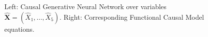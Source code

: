 \documentclass[a4paper, 11pt]{article}
\begin{document}
\begin{figure}[!h]
    \caption{Left: Causal Generative Neural Network over variables $\hat{\mathbf{X}} = (\hat{X}_1, \ldots, \hat{X}_5)$. Right: Corresponding Functional Causal Model  equations.}
    \label{figure:CGNN_FCM}
\end{figure}
\def\z{\mbox{${\bf z}$}}
\def\zp{\mbox{$\hat{\bf z}$}}
\end{document}
